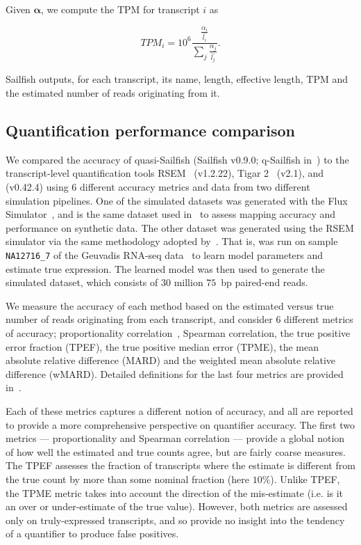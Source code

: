 Given $\bm{\alpha}$, we compute the TPM for transcript $i$ as

\begin{equation}
  TPM_i = 10^6 \frac{\frac{\alpha_i}{\hat{l_i}}}{\sum_{j}\frac{\alpha_j}{\hat{l_j}}}.
\label{eqn:tpm}
\end{equation}

Sailfish outputs, for each transcript, its name, length, effective length, TPM and the estimated number of reads originating from it.

\subsection{Quantification performance comparison}
\label{subsec:quant_compare}

We compared the accuracy of quasi-Sailfish (Sailfish v0.9.0; q-Sailfish in~) to the transcript-level quantification tools RSEM~\citep{li2010rna} (v1.2.22), Tigar 2~\citep{tigar2} (v2.1), and \kallisto~\citep{kallisto} (v0.42.4) using 6 different accuracy metrics and data from two different simulation pipelines. One of the simulated datasets was generated with the Flux Simulator~\citep{fluxsim}, and is the same dataset used in~ to assess mapping accuracy and performance on synthetic data.  The other dataset was generated using the RSEM simulator via the same methodology adopted by~\citet{kallisto}.  That is,  was run on sample \texttt{NA12716\_7} of the Geuvadis RNA-seq data~\citep{Lappalainen2013Transcriptome} to learn model parameters and estimate true expression. The learned model was then used to generate the simulated dataset, which consists of $30$ million $75$~bp paired-end reads.

We measure the accuracy of each method based on the estimated versus true number of reads originating from each transcript, and consider 6 different metrics of accuracy; proportionality correlation~\citep{Lovell2015Proportionality}, Spearman correlation, the true positive error fraction (TPEF), the true positive median error (TPME), the mean absolute relative difference (MARD) and the weighted mean absolute relative difference (wMARD). Detailed definitions for the last four metrics are provided in~. 

Each of these metrics captures a different notion of accuracy, and all are reported to provide a more comprehensive perspective on quantifier accuracy.  The first two metrics --- proportionality and Spearman correlation --- provide a global notion of how well the estimated and true counts agree, but are fairly coarse measures. The TPEF assesses the fraction of transcripts where the estimate is different from the true count by more than some nominal fraction (here $10\%$).  Unlike TPEF, the TPME metric takes into account the direction of the mis-estimate (i.e. is it an over or under-estimate of the true value).  However, both metrics are assessed only on truly-expressed transcripts, and so provide no insight into the tendency of a quantifier to produce false positives.


